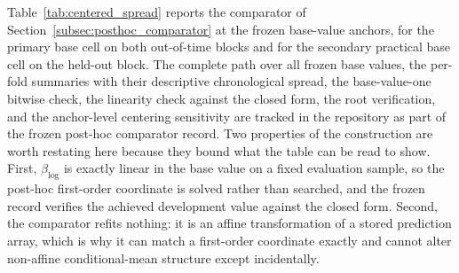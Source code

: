 \documentclass[10pt]{article}
\theoremstyle{definition}
\newcommand{\1}{\mathbf{1}}
\begin{document}
Table~\ref{tab:centered_spread} reports the comparator of
Section~\ref{subsec:posthoc_comparator} at the frozen base-value anchors, for the primary base cell
on both out-of-time blocks and for the secondary practical base cell on the held-out block. The
complete path over all frozen base values, the per-fold summaries with their descriptive
chronological spread, the base-value-one bitwise check, the linearity check against the closed form,
the root verification, and the anchor-level centering sensitivity are tracked in the repository as
part of the frozen post-hoc comparator record. Two properties of the construction are worth restating here because they bound what the
table can be read to show. First, $\beta_{\log}$ is exactly linear in the base value on a fixed
evaluation sample, so the post-hoc first-order coordinate is solved rather than searched, and the
frozen record verifies the achieved development value against the closed form. Second, the
comparator refits nothing: it is an affine transformation of a stored prediction array, which is why
it can match a first-order coordinate exactly and cannot alter non-affine conditional-mean
structure except incidentally.
\end{document}
